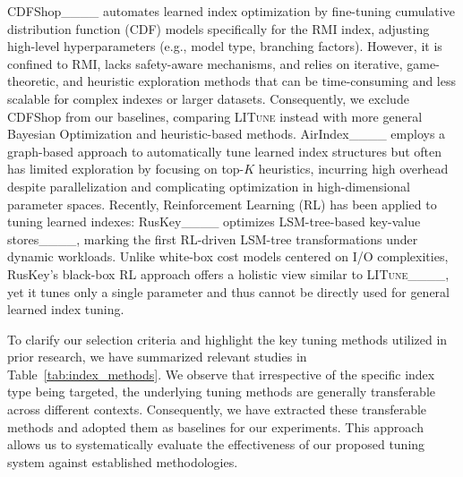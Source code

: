 {\color{black}
CDFShop____ automates learned index optimization by fine-tuning cumulative distribution function (CDF) models specifically for the RMI index, adjusting high-level hyperparameters (e.g., model type, branching factors). However, it is confined to RMI, lacks safety-aware mechanisms, and relies on iterative, game-theoretic, and heuristic exploration methods that can be time-consuming and less scalable for complex indexes or larger datasets. Consequently, we exclude CDFShop from our baselines, comparing \textsc{LITune} instead with more general Bayesian Optimization and heuristic-based methods. AirIndex____ employs a graph-based approach to automatically tune learned index structures but often has limited exploration by focusing on top-$K$ heuristics, incurring high overhead despite parallelization and complicating optimization in high-dimensional parameter spaces. Recently, Reinforcement Learning (RL) has been applied to tuning learned indexes: RusKey____ optimizes LSM-tree-based key-value stores____, marking the first RL-driven LSM-tree transformations under dynamic workloads. Unlike white-box cost models centered on I/O complexities, RusKey’s black-box RL approach offers a holistic view similar to \textsc{LITune}____, yet it tunes only a single parameter and thus cannot be directly used for general learned index tuning. 
}



To clarify our selection criteria and highlight the key tuning methods utilized in prior research, we have summarized relevant studies in Table~\ref{tab:index_methods}. We observe that irrespective of the specific index type being targeted, the underlying tuning methods are generally transferable across different contexts. Consequently, we have extracted these transferable methods and adopted them as baselines for our experiments. This approach allows us to systematically evaluate the effectiveness of our proposed tuning system against established methodologies.


